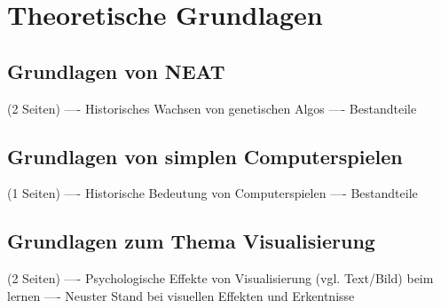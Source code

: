 \chapter{Theoretische Grundlagen}
\label{chapter:2}

\section{Grundlagen von NEAT}
(2 Seiten)
---- Historisches Wachsen von genetischen Algos
---- Bestandteile

\section{Grundlagen von simplen Computerspielen}
(1 Seiten)
---- Historische Bedeutung von Computerspielen
---- Bestandteile

\section{Grundlagen zum Thema Visualisierung}
(2 Seiten)
---- Psychologische Effekte von Visualisierung (vgl. Text/Bild) beim lernen
---- Neuster Stand bei visuellen Effekten und Erkentnisse